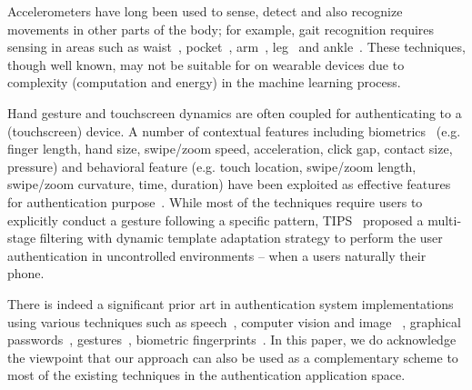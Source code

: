 Accelerometers have long been used to sense, detect and also recognize
movements in other parts of the body; for example, gait recognition requires 
sensing in areas such as waist~\cite{ailisto2005identifying},  
pocket~\cite{gafurov2007gait}, arm~\cite{okumura2006study,gafurov2008arm},
leg~\cite{gafurov2006biometric} and ankle~\cite{gafurov2011user}.
These techniques, though well known, may not be suitable for on wearable 
devices due to complexity (computation and energy) in the machine learning 
process.

Hand gesture and touchscreen dynamics are often coupled for
authenticating to a (touchscreen) device. A number of contextual features
including biometrics~\cite{sae2012biometric} (e.g. finger length, hand size,
swipe/zoom speed, acceleration, click gap, contact size, pressure)
and behavioral feature (e.g. touch location, 
swipe/zoom length,
swipe/zoom curvature, time, duration) have been exploited as
effective features for authentication 
purpose~\cite{frank2013touchalytics,cai2013mobile,feng2014tips}.
While most of the techniques require users to explicitly conduct a
gesture following a specific pattern, TIPS~\cite{feng2014tips}
proposed a multi-stage filtering with dynamic template adaptation
strategy to perform the user authentication in uncontrolled
environments -- when a users naturally their phone. 

There is indeed a significant prior art in authentication system 
implementations using various techniques such as 
speech~\cite{reynolds2000speaker}, computer vision and image
~\cite{bowyer2006survey}, graphical passwords~\cite{biddle2012graphical}, 
gestures~\cite{sherman2014user}, biometric 
fingerprints~\cite{jain1997identity}. 
In this paper, we do acknowledge the viewpoint that our approach can also be 
used as a complementary scheme to most of the existing techniques in the 
authentication application space.



